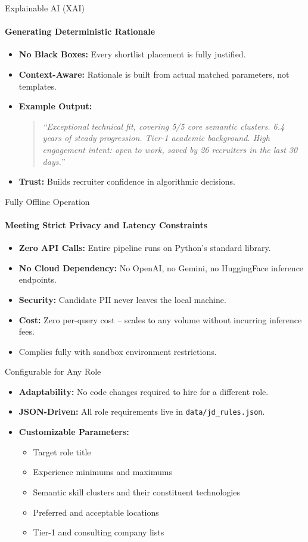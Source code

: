 \documentclass[aspectratio=169]{beamer}
\begin{document}
\begin{frame}{Explainable AI (XAI)}
  \framesubtitle{Generating Deterministic Rationale}
  \begin{itemize}
    \item \textbf{No Black Boxes:} Every shortlist placement is fully justified.
    \item \textbf{Context-Aware:} Rationale is built from actual matched parameters, not templates.
    \item \textbf{Example Output:}
    \begin{quote}
      \small\textit{``Exceptional technical fit, covering 5/5 core semantic clusters. 6.4 years of steady progression. Tier-1 academic background. High engagement intent: open to work, saved by 26 recruiters in the last 30 days.''}
    \end{quote}
    \item \textbf{Trust:} Builds recruiter confidence in algorithmic decisions.
  \end{itemize}
\end{frame}

\begin{frame}{Fully Offline Operation}
  \framesubtitle{Meeting Strict Privacy and Latency Constraints}
  \begin{itemize}
    \item \textbf{Zero API Calls:} Entire pipeline runs on Python's standard library.
    \item \textbf{No Cloud Dependency:} No OpenAI, no Gemini, no HuggingFace inference endpoints.
    \item \textbf{Security:} Candidate PII never leaves the local machine.
    \item \textbf{Cost:} Zero per-query cost -- scales to any volume without incurring inference fees.
    \item Complies fully with sandbox environment restrictions.
  \end{itemize}
\end{frame}

\begin{frame}{Configurable for Any Role}
  \begin{itemize}
    \item \textbf{Adaptability:} No code changes required to hire for a different role.
    \item \textbf{JSON-Driven:} All role requirements live in \texttt{data/jd\_rules.json}.
    \item \textbf{Customizable Parameters:}
    \begin{itemize}
      \item Target role title
      \item Experience minimums and maximums
      \item Semantic skill clusters and their constituent technologies
      \item Preferred and acceptable locations
      \item Tier-1 and consulting company lists
    \end{itemize}
  \end{itemize}
\end{frame}
\end{document}

